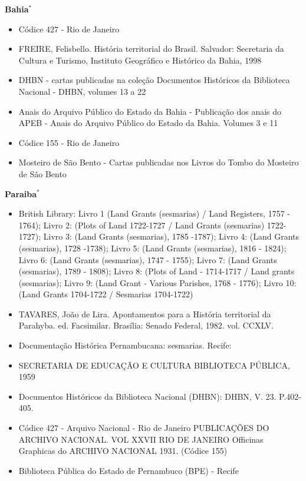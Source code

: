 \documentclass[11pt]{article}
\begin{document}
\begin{comment}
\textbf{Ceara}
\begin{itemize}
  \item 
\end{itemize}
\end{comment}

\clearpage

\textbf{Bahia$^*$}
\begin{itemize}
  \item Códice 427 - Rio de Janeiro
  \item FREIRE, Felisbello. História territorial do Brasil. Salvador: Secretaria da Cultura e Turismo, Instituto Geográfico e Histórico da Bahia, 1998
  \item DHBN - cartas publicadas na coleção Documentos Históricos da Biblioteca Nacional - DHBN, volumes 13 a 22
  \item  Anais do Arquivo Público do Estado da Bahia - Publicação dos anais do APEB - Anais do Arquivo Público do Estado da Bahia. Volumes 3 e 11
  \item Códice 155 - Rio de Janeiro
  \item Mosteiro de São Bento - Cartas publicadas nos Livros do Tombo do Mosteiro de São Bento  
\end{itemize}

\textbf{Paraiba$^*$}
\begin{itemize}
  \item British Library: Livro 1 (Land Grants (sesmarias) / Land Registers, 1757 - 1764); Livro 2: (Plots of Land 1722-1727 / Land Grants (sesmarias) 1722-1727); Livro 3: (Land Grants (sesmarias), 1785 -1787); Livro 4: (Land Grants (sesmarias), 1728 -1738); Livro 5: (Land Grants (sesmarias), 1816 - 1824); Livro 6: (Land Grants (sesmarias), 1747 - 1755); Livro 7: (Land Grants (sesmarias), 1789 - 1808); Livro 8: (Plots of Land - 1714-1717 / Land grants (sesmarias); Livro 9: (Land Grant - Various Parishes, 1768 - 1776); Livro 10: (Land Grants 1704-1722 / Sesmarias 1704-1722)
  \item TAVARES, João de Lira. Apontamentos para a História territorial da Parahyba. ed. Facsimilar. Brasília: Senado Federal, 1982. vol. CCXLV.
  \item Documentação Histórica Pernambucana: sesmarias. Recife:
  \item SECRETARIA DE EDUCAÇÃO E CULTURA BIBLIOTECA PÚBLICA, 1959
  \item Documentos Históricos da Biblioteca Nacional (DHBN): DHBN, V. 23. P.402-405.
  \item Códice 427 - Arquivo Nacional - Rio de Janeiro
  PUBLICAÇÕES DO ARCHIVO NACIONAL. VOL XXVII RIO DE
  JANEIRO Officinas Graphicas do ARCHIVO NACIONAL 1931. (Códice 155)
  \item Biblioteca Pública do Estado de Pernambuco (BPE) - Recife
  
\end{itemize}
\end{document}
